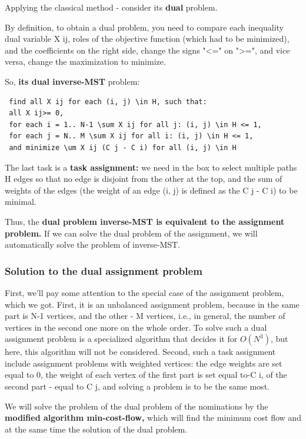 Applying the classical method - consider its \textbf{dual} problem.

By definition, to obtain a dual problem, you need to compare each inequality dual variable X ij, roles of the objective function (which had to be minimized), and the coefficients on the right side, change the signs "<=" on ">=", and vice versa, change the maximization to minimize.

So, \textbf{its dual inverse-MST} problem:

\begin{verbatim}
 find all X ij for each (i, j) \in H, such that:
 all X ij>= 0,
 for each i = 1.. N-1 \sum X ij for all j: (i, j) \in H <= 1,
 for each j = N.. M \sum X ij for all i: (i, j) \in H <= 1,
 and minimize \um X ij (C j - C i) for all (i, j) \in H 
\end{verbatim}
The last task is a \textbf{task assignment:} we need in the box to select multiple paths H edges so that no edge is disjoint from the other at the top, and the sum of weights of the edges (the weight of an edge (i, j) is defined as the C j - C i) to be minimal.

Thus, the \textbf{dual problem inverse-MST is equivalent to the assignment problem.} If we can solve the dual problem of the assignment, we will automatically solve the problem of inverse-MST.

\subsubsection{ Solution to the dual assignment problem }
First, we'll pay some attention to the special case of the assignment problem, which we got. First, it is an unbalanced assignment problem, because in the same part is N-1 vertices, and the other - M vertices, i.e., in general, the number of vertices in the second one more on the whole order. To solve such a dual assignment problem is a specialized algorithm that decides it for $O(N^3)$, but here, this algorithm will not be considered. Second, such a task assignment include assignment problems with weighted vertices: the edge weights are set equal to 0, the weight of each vertex of the first part is set equal to-C i, of the second part - equal to C j, and solving a problem is to be the same most.

We will solve the problem of the dual problem of the nominations by the \textbf{modified algorithm min-cost-flow,} which will find the minimum cost flow and at the same time the solution of the dual problem.

